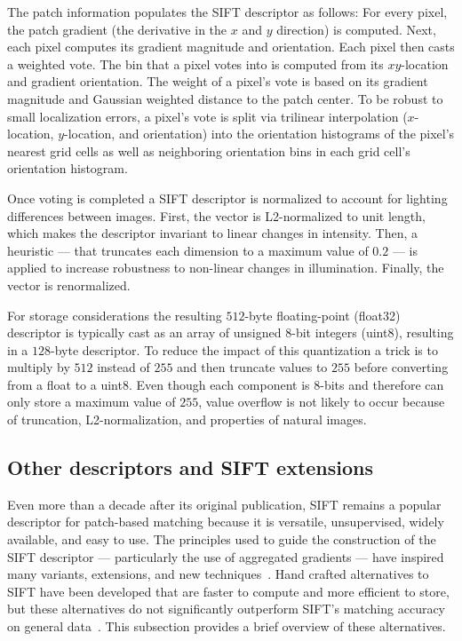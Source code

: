         The patch information populates the SIFT descriptor as follows: For every pixel, the patch gradient (the
        derivative in the $x$ and $y$ direction) is computed. Next, each pixel computes its gradient magnitude and
        orientation. Each pixel then casts a weighted vote. The bin that a pixel votes into is computed from its
        $xy$-location and gradient orientation. The weight of a pixel's vote is based on its gradient magnitude and
        Gaussian weighted distance to the patch center. To be robust to small localization errors, a pixel's vote
        is split via trilinear interpolation ($x$-location, $y$-location, and orientation) into the orientation
        histograms of the pixel's nearest grid cells as well as neighboring orientation bins in each grid cell's
        orientation histogram.

        Once voting is completed a SIFT descriptor is normalized to account for lighting differences between
        images. First, the vector is L2-normalized to unit length, which makes the descriptor invariant to linear
        changes in intensity. Then, a heuristic --- that truncates each dimension to a maximum value of $0.2$ ---
        is applied to increase robustness to non-linear changes in illumination. Finally, the vector is
        renormalized.

        For storage considerations the resulting $512$-byte floating-point (float32) descriptor is typically cast
          as an array of unsigned $8$-bit integers (uint8), resulting in a $128$-byte descriptor.
        To reduce the impact of this quantization a trick is to multiply by $512$ instead of $255$ and then
          truncate values to $255$ before converting from a float to a uint8.
        Even though each component is $8$-bits and therefore can only store a maximum value of $255$, value
          overflow is not likely to occur because of truncation, L2-normalization, and properties of natural
          images.
    
       \vizfeatrow{}

    \subsection{Other descriptors and SIFT extensions}
        Even more than a decade after its original publication, SIFT remains a popular descriptor for patch-based
        matching because it is versatile, unsupervised, widely available, and easy to use. The principles used to
        guide the construction of the SIFT descriptor --- particularly the use of aggregated gradients --- have
        inspired many variants, extensions, and new techniques~\cite{mikolajczyk_performance_2005,
        dalal_histograms_2005, bay_surf_2006}. Hand crafted alternatives to SIFT have been developed that are
        faster to compute and more efficient to store, but these alternatives do not significantly outperform
        SIFT's matching accuracy on general data~\cite{lowe_distinctive_2004, mikolajczyk_performance_2005,
        alahi_freak_2012}. This subsection provides a brief overview of these alternatives.

